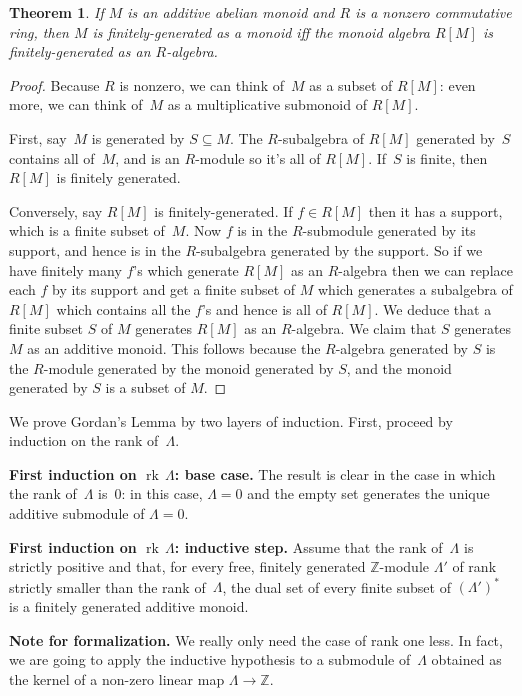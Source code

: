 \documentclass{amsart}
\newcommand{\Z}{\mathbb{Z}}
\newcommand{\form}[1]{\medskip
\parbox{330pt}
{\small{{\textbf{Note for formalization.}}
#1}}
\medskip}
\DeclareMathOperator{\rk}{rk\,}
\newtheorem{theorem}{Theorem}
\begin{document}
\begin{theorem} \label{t:RMfg}
If $M$ is an additive abelian monoid and $R$ is a nonzero commutative ring, then $M$ is finitely-generated as a monoid iff the monoid algebra $R[M]$ is finitely-generated as an $R$-algebra.
\end{theorem}
\begin{proof} Because $R$ is nonzero, we can think of~$M$ as a subset of $R[M]$: even more, we can think of~$M$ as a multiplicative submonoid of $R[M]$.

First, say~$M$ is generated by $S\subseteq M$. The $R$-subalgebra of $R[M]$ generated by~$S$ contains all of~$M$, and is an $R$-module so it's all of $R[M]$.  If~$S$ is finite, then $R[M]$ is finitely generated.

Conversely, say $R[M]$ is finitely-generated. If $f\in R[M]$ then it has a support, which is a finite subset of~$M$. Now $f$ is in the $R$-submodule generated by its support, and hence is in the $R$-subalgebra generated by the support. So if we have finitely many $f$'s which generate $R[M]$ as an $R$-algebra then we can replace each $f$ by its support and get a finite subset of $M$ which generates a subalgebra of $R[M]$ which contains all the $f$'s and hence is all of $R[M]$. We deduce that a finite subset $S$ of $M$ generates $R[M]$ as an $R$-algebra. We claim that $S$ generates $M$ as an additive monoid. This follows because the $R$-algebra generated by $S$ is the $R$-module generated by the monoid generated by $S$, and the monoid generated by $S$ is a subset of $M$.
\end{proof}

We prove Gordan's Lemma by two layers of induction.  First, proceed by induction on the rank of~$\Lambda$.

\noindent
{\textbf{First induction on $\rk \Lambda$: base case.}}
The result is clear in the case in which the rank of~$\Lambda$ is~$0$: in this case, $\Lambda = 0$ and the empty set generates the unique additive submodule of $\Lambda = 0$.

\noindent
{\textbf{First induction on $\rk \Lambda$: inductive step.}}
Assume that the rank of~$\Lambda$ is strictly positive and that, for every free, finitely generated $\Z$-module $\Lambda'$ of rank strictly smaller than the rank of~$\Lambda$, the dual set of every finite subset of $\left(\Lambda'\right)^*$ is a finitely generated additive monoid.

\form{We really only need the case of rank one less.  In fact, we are going to apply the inductive hypothesis to a submodule of~$\Lambda$ obtained as the kernel of a non-zero linear map $\Lambda \to \Z$.}
\end{document}
